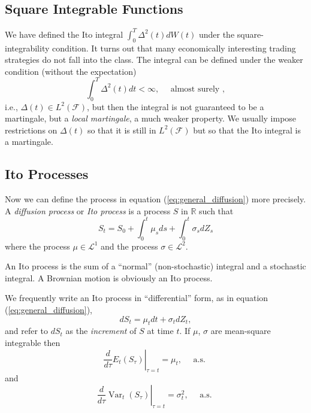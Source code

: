 \documentclass[\topdir/lecture\_notes.tex]{subfiles}
\begin{document}
\subsection{Square Integrable Functions}
We have defined the Ito integral \(\int_{0}^{T} \Delta^{2}(t) dW(t)\) under the square-integrability condition. It turns out that many economically interesting trading strategies do not fall into the class. The integral can be defined under the weaker condition (without the expectation)
\begin{equation*}
\int_{0}^{T} \Delta^{2}(t)dt<\infty, \quad \text{ almost surely },
\end{equation*}
i.e., \(\Delta (t) \in L^{2}(\mathcal{F})\),
but then the integral is not guaranteed to be a martingale, but a \textit{local martingale}, a much weaker property. We usually impose restrictions on  \(\Delta (t)\) so that it is still in \(L^{2}(\mathcal{F})\) but so that the Ito integral is a martingale.





\subsection{Ito Processes}
Now we can define the process in equation (\ref{eq:general_diffusion}) more precisely. A \emph{diffusion process} or \emph{Ito process} is a process \(S\) in \(\mathbb{R}\) such that
\begin{equation}
S_{t}=S_{0}+\int_{0}^{t} \mu_{s} ds+\int_{0}^{t} \sigma_{s} dZ_{s} \label{eq:ito_process}
\end{equation}
where the process \(\mu \in \mathcal{L}^{1}\) and the process \(\sigma \in \mathcal{L}^{2}\).

An Ito process is the sum of a ``normal'' (non-stochastic) integral and a stochastic integral. A Brownian motion is obviously an Ito process.

We frequently write an Ito process in ``differential'' form, as in equation (\ref{eq:general_diffusion}),
\begin{equation}
dS_{t}=\mu_{t} dt+\sigma_{t} dZ_{t}, \label{eq:ito_process_differential}
\end{equation}
and refer to \(dS_{t}\) as the \emph{increment} of \(S\) at time \(t\). If \(\mu\), \(\sigma\) are mean-square integrable then
\begin{equation}
\left.\frac{d}{d \tau} E_{t}\left(S_{\tau}\right)\right|_{\tau=t}=\mu_{t}, \quad \text { a.s. }
\end{equation}
and
\begin{equation}
\left.\frac{d}{d \tau} \operatorname{Var}_{t}\left(S_{\tau}\right)\right|_{\tau=t}=\sigma_{t}^{2}, \quad \text { a.s. }
\end{equation}
\end{document}
